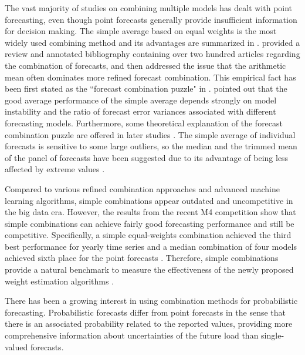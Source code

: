 \documentclass[11pt]{article}
\begin{document}
The vast majority of studies on combining multiple models has dealt with point forecasting, even though point forecasts generally provide insufficient information for decision making. The simple average based on equal weights is the most widely used combining method \citep[see][]{Bunn1985-vo,Clemen1986-pd,Stock2003-sp} and its advantages are summarized in \cite{Palm1992-im}. \cite{Clemen1989-fb} provided a review and annotated bibliography containing over two hundred articles regarding the combination of forecasts, and then addressed the issue that the arithmetic mean often dominates more refined forecast combination. This empirical fact has been first stated as the ``forecast combination puzzle" in \cite{Stock2004-rq}. \cite{Timmermann2006-en} pointed out that the good average performance of the simple average depends strongly on model instability and the ratio of forecast error variances associated with different forecasting models. Furthermore, some theoretical explanation of the forecast combination puzzle are offered in later studies \citep[see][]{Smith2009-wd,Claeskens2016-pv}. The simple average of individual forecasts is sensitive to some large outliers, so the median and the trimmed mean of the panel of forecasts have been suggested due to its advantage of being less affected by extreme values \citep[e.g.,][]{Chan1999-io,Stock2004-rq,Jose2008-vm,Genre2013-ut}.

Compared to various refined combination approaches and advanced machine learning algorithms, simple combinations appear outdated and uncompetitive in the big data era. However, the results from the recent M4 competition \citep{Makridakis2020-hu} show that simple combinations can achieve fairly good forecasting performance and still be competitive. Specifically, a simple equal-weights combination achieved the third best performance for yearly time series \citep{Shaub2019-on} and a median combination of four models achieved sixth place for the point forecasts \citep{Petropoulos2020-fp}. Therefore, simple combinations provide a natural benchmark to measure the effectiveness of the newly proposed weight estimation algorithms \citep[e.g.,][]{Makridakis2000-he,Makridakis2020-hu,Montero-Manso2020-tq,Kang2020-rl,Wang2021-un}.

There has been a growing interest in using combination methods for probabilistic forecasting. Probabilistic forecasts differ from point forecasts in the sense that there is an associated probability related to the reported values, providing more comprehensive information about uncertainties of the future load than single-valued forecasts. 
\end{document}
